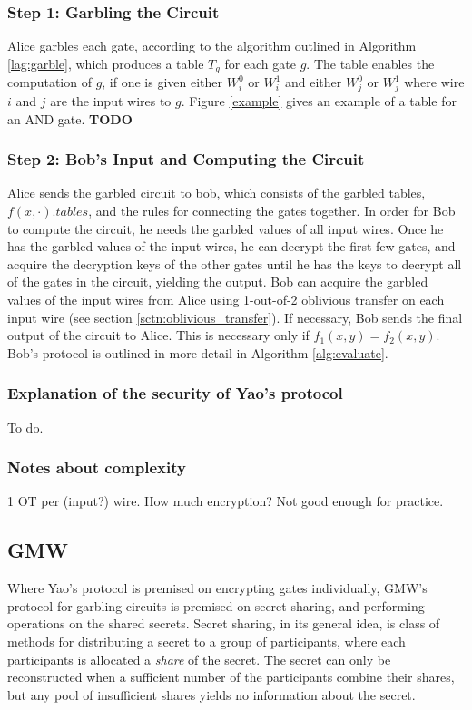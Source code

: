 \subsubsection{Step 1: Garbling the Circuit}
Alice garbles each gate, according to the algorithm outlined in Algorithm \ref{lag:garble}, which produces a table $T_g$ for each gate $g$.
The table enables the computation of $g$, if one is given either $W^0_i$ or $W^1_i$ and either $W^0_j$ or $W^1_j$ where wire $i$ and $j$ are the input wires to $g$.
Figure \ref{example} gives an example of a table for an AND gate. \textbf{TODO}

\subsubsection{Step 2: Bob's Input and Computing the Circuit}
Alice sends the garbled circuit to bob, which consists of the garbled tables, $f(x,\cdot).tables$, and the rules for connecting the gates together.
In order for Bob to compute the circuit, he needs the garbled values of all input wires.
Once he has the garbled values of the input wires, he can decrypt the first few gates, and acquire the decryption keys of the other gates until he has the keys to decrypt all of the gates in the circuit, yielding the output.
Bob can acquire the garbled values of the input wires from Alice using 1-out-of-2 oblivious transfer on each input wire (see section \ref{sctn:oblivious_transfer}).
If necessary, Bob sends the final output of the circuit to Alice. 
This is necessary only if $f_1(x,y) = f_2(x,y)$. 
Bob's protocol is outlined in more detail in Algorithm \ref{alg:evaluate}.

\subsubsection{Explanation of the security of Yao's protocol}
To do.

\subsubsection{Notes about complexity}
1 OT per (input?) wire.
How much encryption?
Not good enough for practice.

\subsection{GMW}
Where Yao's protocol is premised on encrypting gates individually, GMW's protocol for garbling circuits is premised on secret sharing, and performing operations on the shared secrets. 
Secret sharing, in its general idea, is class of methods for distributing a secret to a group of participants, where each participants is allocated a \textit{share} of the secret. 
The secret can only be reconstructed when a sufficient number of the participants combine their shares, but any pool of insufficient shares yields no information about the secret.

